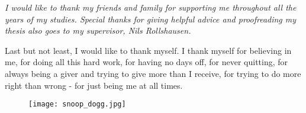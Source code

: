 
\bigskip

\begingroup
\let\clearpage\relax
\let\cleardoublepage\relax
\let\cleardoublepage\relax

{\slshape 
I would like to thank my friends and family for supporting me throughout all the years of my studies. Special thanks for giving helpful advice and proofreading my thesis also goes to my supervisor, Nils Rollshausen.

\bigskip

Last but not least, I would like to thank myself. I thank myself for believing in me, for doing all this hard work, for having no days off, for never quitting, for always being a giver and trying to give more than I receive, for trying to do more right than wrong - for just being me at all times.
}

\begin{figure}
	\centering
	\texttt{[image: snoop\_dogg.jpg]}
\end{figure}

\vspace{15cm}

\endgroup
